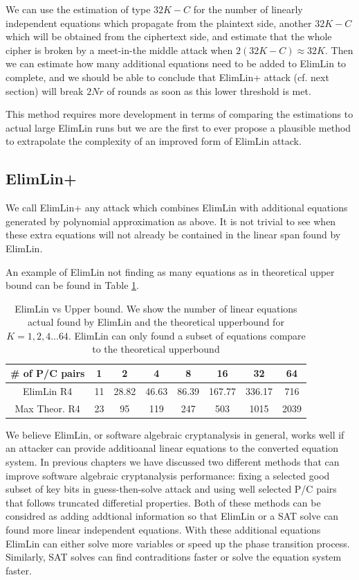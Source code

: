 \begin{conj}
We can use the estimation of type $32K-C$ for the number of linearly independent equations 
which propagate from the plaintext side, another $32K-C$ which will be obtained from the ciphertext side, 
and estimate that the whole cipher is broken by a meet-in-the middle attack when $2(32K-C)\approx 32K$. 
Then we can estimate how many additional equations need to be added to ElimLin to complete, 
and we should be able to conclude that ElimLin+ attack (cf. next section) 
will break $2Nr$ of rounds as soon as this lower threshold is met. 

This method requires more development in terms of comparing the estimations to actual large ElimLin runs 
but we are the first to ever propose a plausible method to extrapolate the complexity of an improved 
form of ElimLin attack. 
\end{conj}

\subsection{ElimLin+}
We call ElimLin+ any attack which combines ElimLin with additional equations generated by polynomial approximation as above. It is not trivial to see when these extra equations will not already be contained in the linear span found by ElimLin.

An example of ElimLin not finding as many equations as in theoretical upper bound can be found in Table \ref{tab:ElimLinVsUpperBound}.
\begin{table}[h!]
	\centering
	\caption[ElimLin vs Upper bound]{ElimLin vs Upper bound. We show the number of linear equations actual found by ElimLin and the theoretical upperbound for $K = 1,2,4 ... 64$. ElimLin can only found a subset of equations compare to the theoretical upperbound}
	\label{tab:ElimLinVsUpperBound}
	\begin{tabular}{|c|c|c|c|c|c|c|c|}
		\hline
		\# of P/C pairs& 1 &	2	& 4 &	8	& 16	& 32	&  64 \\ \hline
		ElimLin R4    & 11 & 28.82 & 46.63 & 86.39 & 167.77 & 336.17 & 716  \\ \hline
		Max Theor. R4 & 23 & 95    & 119   & 247   & 503    & 1015   & 2039 \\ \hline
	\end{tabular}
\end{table}

We believe ElimLin, or software algebraic cryptanalysis in general, works well if an attacker can provide additioanal linear equations to the converted equation system. In previous chapters we have discussed two different methods that can improve software algebraic cryptanalysis performance: fixing a selected good subset of key bits in guess-then-solve attack and using well selected P/C pairs that follows truncated differetial properties. Both of these methods can be considred as adding addtional information so that ElimLin or a SAT solve can found more linear independent equations. With these additional equations ElimLin can either solve more variables or speed up the phase transition process. Similarly, SAT solves can find contraditions faster or solve the equation system faster. 
